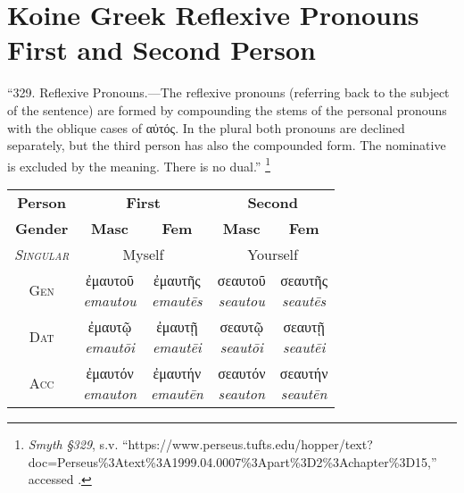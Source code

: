 \documentclass[10pt]{memoir}
\newcommand{\tsc}[1]{\textsc{#1}}
\newcommand{\grc}[1]{\fontspec{Inter}#1}
\newcommand{\trc}[1]{\textit{\fontspec{Tinos}#1}}
\newcommand{\linkfoot}[3]{\footnote{\emph{#1}, s.v. ``{#2},'' accessed \printdate{#3}.}}
\begin{document}
    \section*{Koine Greek Reflexive Pronouns First and Second Person}

    ``329. Reflexive Pronouns.—The reflexive pronouns (referring back to the subject of the sentence) are formed by compounding the stems of the personal pronouns with the oblique cases of \grc{αὐτός}\fontspec{}. In the plural both pronouns are declined separately, but the third person has also the compounded form. The nominative is excluded by the meaning. There is no dual.''
    \linkfoot{Smyth §329}{https://www.perseus.tufts.edu/hopper/text?doc=Perseus\%3Atext\%3A1999.04.0007\%3Apart\%3D2\%3Achapter\%3D15}{2025-05-15}

    \begin{table}[H]
        \begin{tabular}{c|cccc}
            \textbf{Person} & \multicolumn{2}{c}{\textbf{First}} & \multicolumn{2}{c}{\textbf{Second}} \\
            \textbf{Gender} & \textbf{Masc} & \textbf{Fem} & \textbf{Masc} & \textbf{Fem} \\

            \hline
            \emph{\tsc{Singular}} & \multicolumn{2}{c}{Myself} & \multicolumn{2}{c}{Yourself} \\
            \tsc{Gen} & \makecell{\grc{ἐμαυτοῦ} \\ \trc{emautou}} & \makecell{\grc{ἐμαυτῆς} \\ \trc{emautēs}}
            & \makecell{\grc{σεαυτοῦ} \\ \trc{seautou}} & \makecell{\grc{σεαυτῆς} \\ \trc{seautēs}}\\

            \tsc{Dat} & \makecell{\grc{ἐμαυτῷ} \\ \trc{emautōi}} & \makecell{\grc{ἐμαυτῇ} \\ \trc{emautēi}}
            & \makecell{\grc{σεαυτῷ} \\ \trc{seautōi}} & \makecell{\grc{σεαυτῇ} \\ \trc{seautēi}}\\

            \tsc{Acc} & \makecell{\grc{ἐμαυτόν} \\ \trc{emauton}} & \makecell{\grc{ἐμαυτήν} \\ \trc{emautēn}}
            & \makecell{\grc{σεαυτόν} \\ \trc{seauton}} & \makecell{\grc{σεαυτήν} \\ \trc{seautēn}}\\


\end{tabular}
\end{table}
\end{document}
